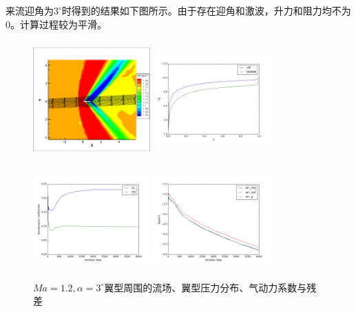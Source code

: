 \documentclass[UTF8]{ctexart}
\begin{document}
\indent 来流迎角为$3^\circ$时得到的结果如下图所示。由于存在迎角和激波，升力和阻力均不为0。计算过程较为平滑。
\begin{figure}[htbp]\centering
  \begin{minipage}{5cm}
    \centering
    \includegraphics[height=4.5cm,width=4.5cm]{../pic/1.2_3_flowfield.png}
  \end{minipage}%
  \begin{minipage}{5cm}
    \centering
    \includegraphics[height=4.5cm,width=4.5cm]{../pic/1.2_3_Cp.png}
  \end{minipage}

  \begin{minipage}{5cm}
    \centering
    \includegraphics[height=4.5cm,width=4.5cm]{../pic/1.2_3_cl_cd.png}
  \end{minipage}%
  \begin{minipage}{5cm}
    \centering
    \includegraphics[height=4.5cm,width=4.5cm]{../pic/1.2_3_residual.png}
  \end{minipage}
  \caption{$Ma=1.2,\alpha=3^\circ$翼型周围的流场、翼型压力分布、气动力系数与残差}
\end{figure}
\end{document}
